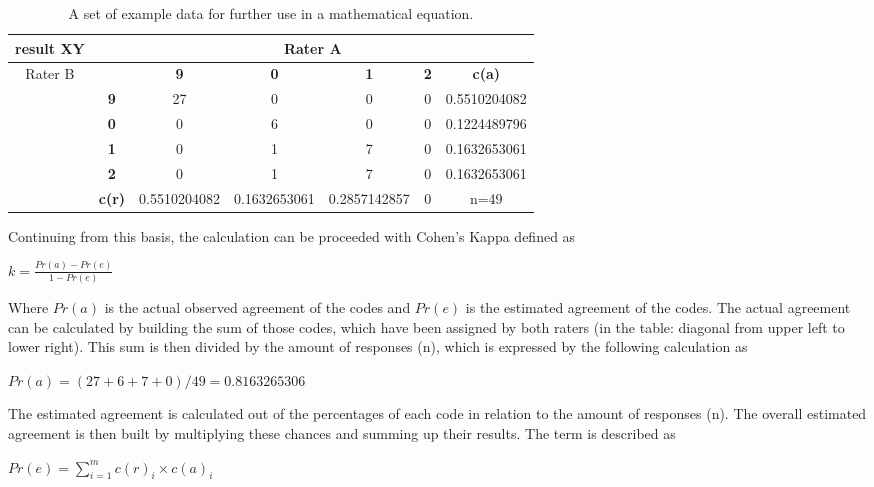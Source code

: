 \begin{table}[H]
\begin{center}
\begin{tabular}{|c|c|c|c|c|c|c|}
\hline
result XY & \multicolumn{6}{c|}{Rater A}\\\hline
 \multirow{6}{*}{Rater B}& & \textbf{9} & \textbf{0} & \textbf{1} & \textbf{2} & \textbf{c(a) }\\\cline{2-7}
 & \textbf{9}& 27	&0&	0	&0 & 0.5510204082\\\cline{2-7}
&\textbf{0}	&0	&6	&0	&0&0.1224489796\\\cline{2-7}
&\textbf{1}	&0	&1	&7	&0&0.1632653061\\\cline{2-7}
&\textbf{2}	&0	&1	&7	&0&0.1632653061\\\cline{2-7}
&\textbf{c(r)} & 0.5510204082 & 0.1632653061 & 0.2857142857 & 0& n=49\\\hline

\end{tabular}
\caption[Example data for mathematical equations]{A set of example data for further use in a mathematical equation.  }
\end{center}
\end{table}

Continuing from this basis, the calculation can be proceeded with Cohen's Kappa defined as

\begin{center}
$k=\frac{Pr(a) - Pr(e)}{1 - Pr(e)}$
\end{center}

Where $Pr(a)$ is the actual observed agreement of the codes and $Pr(e)$ is the estimated agreement of the codes. The actual agreement can be calculated by building the sum of those codes, which have been assigned by both raters (in the table: diagonal from upper left to lower right). This sum is then divided by the amount of responses (n), which is expressed by the following calculation as 

\begin{center}
$Pr(a) = ( 27 + 6 + 7 + 0 ) / 49 = 0.8163265306$
\end{center}

The estimated agreement is calculated out of the percentages of each code in relation to the amount of responses (n). The overall estimated agreement is then built by multiplying these chances and summing up their results. The term is described as

\begin{center}
$Pr(e) = \displaystyle\sum_{i=1}^{m} c(r)_i \times c(a)_i $
\end{center}

